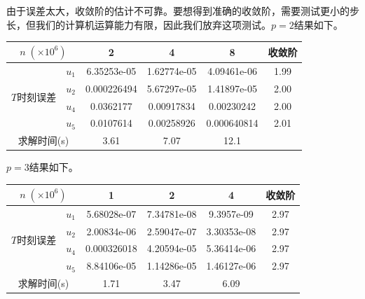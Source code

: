 \documentclass[lang=cn,10pt,bibend=bibtex]{elegantbook}
\begin{document}
由于误差太大，收敛阶的估计不可靠。要想得到准确的收敛阶，需要测试更小的步长，但我们的计算机运算能力有限，因此我们放弃这项测试。$p=2$结果如下。

\vspace{-.8em}
\begin{table}[H]
  \centering
  \renewcommand\arraystretch{0.75}
  \begin{tabular}{cc|ccc|c}
  \multicolumn{2}{c|}{$n\;(\times 10^6)$}                  & 2 & 4 & 8  & 收敛阶 \\ \hline
  \multicolumn{1}{c|}{\multirow{4}{*}{$T$时刻误差}} & \multicolumn{1}{c|}{$u_1$} &  6.35253e-05  &  1.62774e-05 & 4.09461e-06   &  1.99   \\
  \multicolumn{1}{c|}{}                         & \multicolumn{1}{c|}{$u_2$} &   0.000226494    & 5.67297e-05  & 1.41897e-05    &  2.00   \\
  \multicolumn{1}{c|}{}                         & \multicolumn{1}{c|}{$u_4$} &   0.0362177    & 0.00917834  & 0.00230242     &  2.00   \\
  \multicolumn{1}{c|}{}                         & \multicolumn{1}{c|}{$u_5$} &   0.0107614   & 0.00258926  & 0.000640814     &  2.01  \\ \hline
  \multicolumn{2}{c|}{求解时间(s)} & 3.61 & 7.07 & 12.1 & 
  \end{tabular}
\end{table}
\vspace{-1em}

$p=3$结果如下。

\vspace{-.8em}
\begin{table}[H]
  \centering
  \renewcommand\arraystretch{0.75}
  \begin{tabular}{cc|ccc|c}
  \multicolumn{2}{c|}{$n\;(\times 10^6)$}                  & 1 & 2 & 4  & 收敛阶 \\ \hline
  \multicolumn{1}{c|}{\multirow{4}{*}{$T$时刻误差}} & \multicolumn{1}{c|}{$u_1$} &   5.68028e-07 &  7.34781e-08 & 9.3957e-09     &  2.97   \\
  \multicolumn{1}{c|}{}                         & \multicolumn{1}{c|}{$u_2$} &   2.00834e-06    & 2.59047e-07  & 3.30353e-08    &  2.97   \\
  \multicolumn{1}{c|}{}                         & \multicolumn{1}{c|}{$u_4$} &   0.000326018    & 4.20594e-05  & 5.36414e-06     &  2.97   \\
  \multicolumn{1}{c|}{}                         & \multicolumn{1}{c|}{$u_5$} &   8.84106e-05   & 1.14286e-05  & 1.46127e-06     &  2.97  \\ \hline
  \multicolumn{2}{c|}{求解时间(s)} & 1.71 & 3.47 & 6.09 & 
  \end{tabular}
\end{table}
\vspace{-1em}
\end{document}
